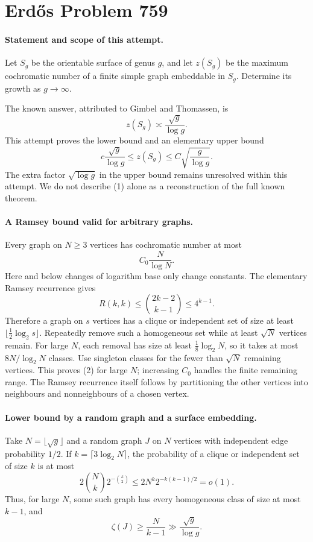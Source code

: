 \section*{Erd\H{o}s Problem 759}

\paragraph{Statement and scope of this attempt.}
Let \(S_g\) be the orientable surface of genus \(g\), and let \(z(S_g)\) be the maximum cochromatic number of a finite simple graph embeddable in \(S_g\). Determine its growth as \(g\to\infty\).

The known answer, attributed to Gimbel and Thomassen, is
\[
 z(S_g)\asymp\frac{\sqrt g}{\log g}.
\]
This attempt proves the lower bound and an elementary upper bound
\[
 c\frac{\sqrt g}{\log g}
 \leq z(S_g)\leq C\sqrt{\frac g{\log g}}. \tag{1}
\]
The extra factor \(\sqrt{\log g}\) in the upper bound remains unresolved within this attempt. We do not describe (1) alone as a reconstruction of the full known theorem.

\paragraph{A Ramsey bound valid for arbitrary graphs.}
Every graph on \(N\geq3\) vertices has cochromatic number at most
\[
 C_0\frac{N}{\log N}. \tag{2}
\]
Here and below changes of logarithm base only change constants. The elementary Ramsey recurrence gives
\[
 R(k,k)\leq\binom{2k-2}{k-1}\leq4^{k-1}.
\]
Therefore a graph on \(s\) vertices has a clique or independent set of size at least \(\lfloor\tfrac12\log_2s\rfloor\). Repeatedly remove such a homogeneous set while at least \(\sqrt N\) vertices remain. For large \(N\), each removal has size at least \(\tfrac18\log_2N\), so it takes at most \(8N/\log_2N\) classes. Use singleton classes for the fewer than \(\sqrt N\) remaining vertices. This proves (2) for large \(N\); increasing \(C_0\) handles the finite remaining range. The Ramsey recurrence itself follows by partitioning the other vertices into neighbours and nonneighbours of a chosen vertex.

\paragraph{Lower bound by a random graph and a surface embedding.}
Take \(N=\lfloor\sqrt g\rfloor\) and a random graph \(J\) on \(N\) vertices with independent edge probability \(1/2\). If \(k=\lceil3\log_2N\rceil\), the probability of a clique or independent set of size \(k\) is at most
\[
 2\binom Nk2^{-\binom k2}
 \leq2N^k2^{-k(k-1)/2}=o(1).
\]
Thus, for large \(N\), some such graph has every homogeneous class of size at most \(k-1\), and
\[
 \zeta(J)\geq\frac{N}{k-1}\gg\frac{\sqrt g}{\log g}. \tag{3}
\]

